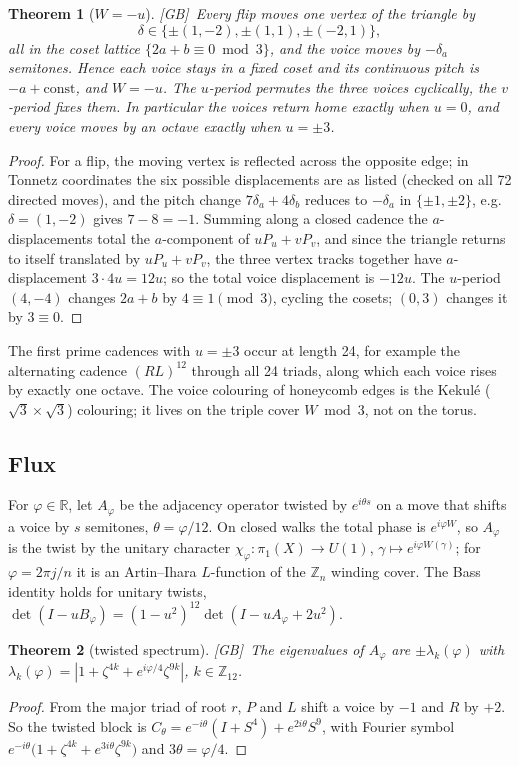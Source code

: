 \documentclass[11pt]{amsart}
\numberwithin{equation}{section}
\theoremstyle{plain}
\newtheorem{theorem}{Theorem}[section]
\theoremstyle{definition}\newtheorem{definition}[theorem]{Definition}
\theoremstyle{remark}\newtheorem{remark}[theorem]{Remark}
\newcommand{\Z}{\mathbb{Z}}\newcommand{\Q}{\mathbb{Q}}\newcommand{\C}{\mathbb{C}}\newcommand{\F}{\mathbb{F}}\newcommand{\R}{\mathbb{R}}
\newcommand{\ctag}[1]{\textup{\textsf{\scriptsize[#1]}}}
\begin{document}
\begin{theorem}[$W=-u$]\label{thm:W}
\ctag{GB}\ Every flip moves one vertex of the triangle by
\[\delta\in\{\pm(1,-2),\pm(1,1),\pm(-2,1)\},\]
all in the coset lattice $\{2a+b\equiv0\bmod 3\}$, and the voice moves by $-\delta_a$ semitones. Hence each voice stays in a fixed coset and its continuous pitch is $-a+\text{const}$, and $W=-u$. The $u$-period permutes the three voices cyclically, the $v$-period fixes them. In particular the voices return home exactly when $u=0$, and every voice moves by an octave exactly when $u=\pm3$.
\end{theorem}
\begin{proof}
For a flip, the moving vertex is reflected across the opposite edge; in Tonnetz coordinates the six possible displacements are as listed (checked on all 72 directed moves), and the pitch change $7\delta_a+4\delta_b$ reduces to $-\delta_a$ in $\{\pm1,\pm2\}$, e.g.\ $\delta=(1,-2)$ gives $7-8=-1$. Summing along a closed cadence the $a$-displacements total the $a$-component of $uP_u+vP_v$, and since the triangle returns to itself translated by $uP_u+vP_v$, the three vertex tracks together have $a$-displacement $3\cdot4u=12u$; so the total voice displacement is $-12u$. The $u$-period $(4,-4)$ changes $2a+b$ by $4\equiv1\pmod3$, cycling the cosets; $(0,3)$ changes it by $3\equiv0$.
\end{proof}
The first prime cadences with $u=\pm3$ occur at length 24, for example the alternating cadence $(RL)^{12}$ through all 24 triads, along which each voice rises by exactly one octave. The voice colouring of honeycomb edges is the Kekul\'e ($\sqrt3\times\sqrt3$) colouring; it lives on the triple cover $W\bmod3$, not on the torus.

\subsection{Flux}
For $\varphi\in\R$, let $A_\varphi$ be the adjacency operator twisted by $e^{i\theta s}$ on a move that shifts a voice by $s$ semitones, $\theta=\varphi/12$. On closed walks the total phase is $e^{i\varphi W}$, so $A_\varphi$ is the twist by the unitary character $\chi_\varphi:\pi_1(X)\to U(1)$, $\gamma\mapsto e^{i\varphi W(\gamma)}$; for $\varphi=2\pi j/n$ it is an Artin--Ihara $L$-function of the $\Z_n$ winding cover. The Bass identity holds for unitary twists, $\det(I-uB_\varphi)=(1-u^2)^{12}\det(I-uA_\varphi+2u^2)$.

\begin{theorem}[twisted spectrum]\label{thm:twist}
\ctag{GB}\ The eigenvalues of $A_\varphi$ are $\pm\lambda_k(\varphi)$ with $\lambda_k(\varphi)=|1+\zeta^{4k}+e^{i\varphi/4}\zeta^{9k}|$, $k\in\Z_{12}$.
\end{theorem}
\begin{proof}
From the major triad of root $r$, $P$ and $L$ shift a voice by $-1$ and $R$ by $+2$. So the twisted block is $C_\theta=e^{-i\theta}(I+S^4)+e^{2i\theta}S^9$, with Fourier symbol $e^{-i\theta}\big(1+\zeta^{4k}+e^{3i\theta}\zeta^{9k}\big)$ and $3\theta=\varphi/4$.
\end{proof}
\end{document}
